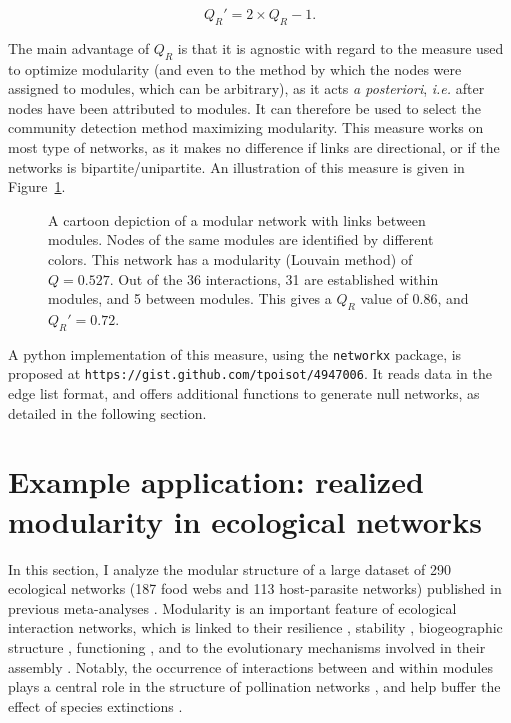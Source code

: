\documentclass[12pt,oneside]{article}
\begin{document}
\begin{equation}
	Q_R' = 2\times Q_R - 1 .
	\label{e:tqr}
\end{equation}

The main advantage of $Q_R$ is that it is agnostic with regard to the measure
used to optimize modularity (and even to the method by which the nodes were
assigned to modules, which can be arbitrary), as it acts \emph{a posteriori},
\emph{i.e.} after nodes have been attributed to modules. It can therefore be
used to select the community detection method maximizing modularity. This
measure works on most type of networks, as it makes no difference if links are
directional, or if the networks is bipartite/unipartite. An illustration of
this measure is given in Figure~\ref{f:illu}.

\begin{figure}[tb]
	\begin{center}
		
	\end{center}
	\caption{A cartoon depiction of a modular network with links between modules. Nodes of the same modules are identified by different colors. This network has a modularity (Louvain method) of $Q = 0.527$. Out of the 36 interactions, 31 are established within modules, and 5 between modules. This gives a $Q_R$ value of 0.86, and $Q_R' = 0.72$.}
	\label{f:illu}
\end{figure}

A python implementation of this measure, using the \texttt{networkx} package,
is proposed at \texttt{https://gist.github.com/tpoisot/4947006}. It reads data in the edge list
format, and offers additional functions to generate null networks, as detailed
in the following section.

\section{Example application: realized modularity in ecological networks}

In this section, I analyze the modular structure of a large dataset of 290
ecological networks (187 food webs and 113 host-parasite networks) published in
previous meta-analyses \cite{gravel_trophic_2011,poisot_dissimilarity_2012}.
Modularity is an important feature of ecological interaction networks, which is
linked to their resilience
\cite{fortuna_nestedness_2010,stouffer_compartmentalization_2011}, stability
\parencite{thebault_identifying_2012}, biogeographic structure
\cite{flores_multi-scale_2012}, functioning \cite{thebault_food-web_2003}, and
to the evolutionary mechanisms involved in their assembly
\cite{flores_statistical_2011}. Notably, the occurrence of interactions between
and within modules plays a central role in the structure of pollination
networks \parencite{olesen_modularity_2007}, and help buffer the effect of
species extinctions \parencite{stouffer_compartmentalization_2011}.
\end{document}
